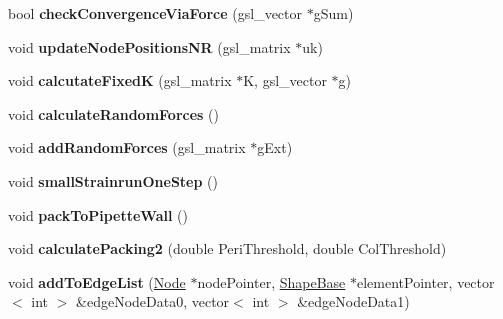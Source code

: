 \begin{DoxyCompactItemize}
\item 
\hypertarget{classSimulation_a8a2b44a93f87f9e0de158c4f422ff13c}{}bool {\bfseries check\+Convergence\+Via\+Force} (gsl\+\_\+vector $\ast$g\+Sum)\label{classSimulation_a8a2b44a93f87f9e0de158c4f422ff13c}

\item 
\hypertarget{classSimulation_aea943e8e0caf1b9ff8e40b61248024b6}{}void {\bfseries update\+Node\+Positions\+N\+R} (gsl\+\_\+matrix $\ast$uk)\label{classSimulation_aea943e8e0caf1b9ff8e40b61248024b6}

\item 
\hypertarget{classSimulation_a0964cdce312e239d588d0dd9cade5190}{}void {\bfseries calcutate\+Fixed\+K} (gsl\+\_\+matrix $\ast$K, gsl\+\_\+vector $\ast$g)\label{classSimulation_a0964cdce312e239d588d0dd9cade5190}

\item 
\hypertarget{classSimulation_ae16977eb346093b2fe00f94e9c485b37}{}void {\bfseries calculate\+Random\+Forces} ()\label{classSimulation_ae16977eb346093b2fe00f94e9c485b37}

\item 
\hypertarget{classSimulation_ad14662c0f9cee95a76c523130e8e688d}{}void {\bfseries add\+Random\+Forces} (gsl\+\_\+matrix $\ast$g\+Ext)\label{classSimulation_ad14662c0f9cee95a76c523130e8e688d}

\item 
\hypertarget{classSimulation_a977de0c85607b9c8e4422ca90776e72a}{}void {\bfseries small\+Strainrun\+One\+Step} ()\label{classSimulation_a977de0c85607b9c8e4422ca90776e72a}

\item 
\hypertarget{classSimulation_a5400ce12848ff3886d56437519728382}{}void {\bfseries pack\+To\+Pipette\+Wall} ()\label{classSimulation_a5400ce12848ff3886d56437519728382}

\item 
\hypertarget{classSimulation_a8ca083728aa268d8adc5a419fd0aef99}{}void {\bfseries calculate\+Packing2} (double Peri\+Threshold, double Col\+Threshold)\label{classSimulation_a8ca083728aa268d8adc5a419fd0aef99}

\item 
\hypertarget{classSimulation_ac14ee5f91a1a0763f895cdb1a6ad632e}{}void {\bfseries add\+To\+Edge\+List} (\hyperlink{classNode}{Node} $\ast$node\+Pointer, \hyperlink{classShapeBase}{Shape\+Base} $\ast$element\+Pointer, vector$<$ int $>$ \&edge\+Node\+Data0, vector$<$ int $>$ \&edge\+Node\+Data1)\label{classSimulation_ac14ee5f91a1a0763f895cdb1a6ad632e}


\end{DoxyCompactItemize}
